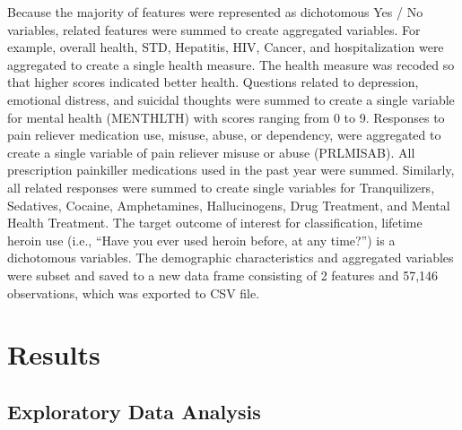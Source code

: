 \documentclass[sigconf]{acmart}
\begin{document}
Because the majority of features were represented as dichotomous Yes / No 
variables, related features were summed to create aggregated variables. For 
example, overall health, STD, Hepatitis, HIV, Cancer, and hospitalization were 
aggregated to create a single health measure. The health measure was recoded
so that higher scores indicated better health. Questions related to depression, 
emotional distress, and suicidal thoughts were summed to create a single 
variable for mental health (MENTHLTH) with scores ranging from 0 to 9. 
Responses to pain reliever medication use, misuse, abuse, or dependency, 
were aggregated to create a single variable of pain reliever misuse or abuse
(PRLMISAB). All prescription painkiller medications used in the past year
were summed. Similarly, all related responses were summed to create single 
variables for Tranquilizers, Sedatives, Cocaine, Amphetamines, Hallucinogens, 
Drug Treatment, and Mental Health Treatment. The target outcome of interest for 
classification, lifetime heroin use (i.e., ``Have you ever used heroin before, 
at any time?'') is a dichotomous variables. The demographic characteristics 
and aggregated variables were subset and saved to a new data frame consisting 
of 2 features and 57,146 observations, which was exported to CSV file. 


\section{Results}

\subsection{Exploratory Data Analysis}
\end{document}
